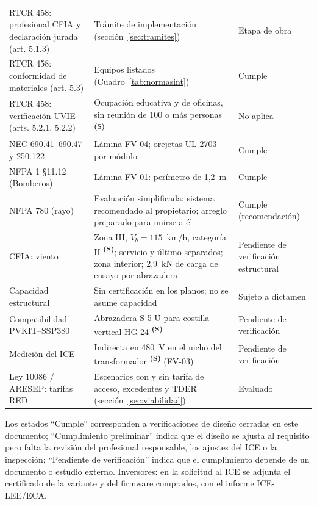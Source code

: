 \documentclass[12pt]{article}
\newcommand{\supuesto}{\textsuperscript{\textcolor{orange!80!black}{\textbf{(S)}}}}
\begin{document}
{\begin{longtable}{L{4.0cm}L{8.2cm}L{2.6cm}}
RTCR 458: profesional CFIA y declaración jurada (art. 5.1.3) & Trámite de implementación (sección~\ref{sec:tramites}) & Etapa de obra\\
RTCR 458: conformidad de materiales (art. 5.3) & Equipos listados (Cuadro~\ref{tab:normasint}) & Cumple\\
RTCR 458: verificación UVIE (arts. 5.2.1, 5.2.2) & Ocupación educativa y de oficinas, sin reunión de 100 o más personas \supuesto{} & No aplica\\
NEC 690.41--690.47 y 250.122 & Lámina FV-04; orejetas UL 2703 por módulo & Cumple\\
NFPA 1 §11.12 (Bomberos) & Lámina FV-01: perímetro de 1,2~m & Cumple\\
NFPA 780 (rayo) & Evaluación simplificada; sistema recomendado al propietario; arreglo preparado para unirse a él & Cumple (recomendación)\\
CFIA: viento & Zona III, $V_b=115$~km/h, categoría II \supuesto{}; servicio y último separados; zona interior; 2,9~kN de carga de ensayo por abrazadera & Pendiente de verificación estructural\\
Capacidad estructural & Sin certificación en los planos; no se asume capacidad & Sujeto a dictamen\\
Compatibilidad PVKIT--SSP380 & Abrazadera S-5-U para costilla vertical HG 24 \supuesto{} & Pendiente de verificación\\
Medición del ICE & Indirecta en 480~V en el nicho del transformador \supuesto{} (FV-03) & Pendiente de verificación\\
Ley 10086 / ARESEP: tarifas RED & Escenarios con y sin tarifa de acceso, excedentes y TDER (sección~\ref{sec:viabilidad}) & Evaluado\\
\bottomrule
\end{longtable}}
{\footnotesize Los estados ``Cumple'' corresponden a verificaciones de diseño cerradas en este documento; ``Cumplimiento preliminar'' indica que el diseño se ajusta al requisito pero falta la revisión del profesional responsable, los ajustes del ICE o la inspección; ``Pendiente de verificación'' indica que el cumplimiento depende de un documento o estudio externo. Inversores: en la solicitud al ICE se adjunta el certificado de la variante y del firmware comprados, con el informe ICE-LEE/ECA.\par}
\end{document}
